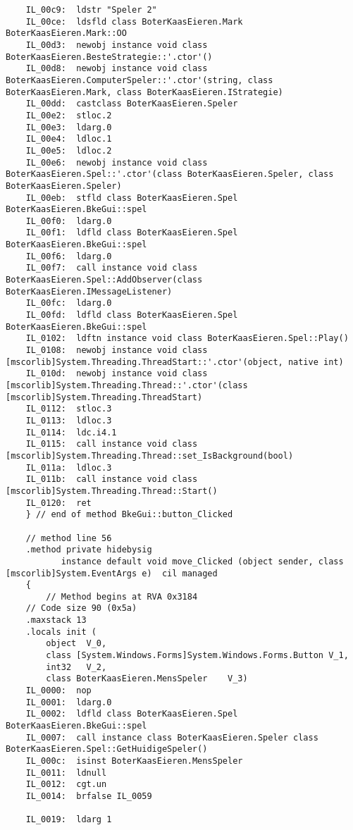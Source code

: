 \begin{lstlisting}
	IL_00c9:  ldstr "Speler 2"
	IL_00ce:  ldsfld class BoterKaasEieren.Mark BoterKaasEieren.Mark::OO
	IL_00d3:  newobj instance void class BoterKaasEieren.BesteStrategie::'.ctor'()
	IL_00d8:  newobj instance void class BoterKaasEieren.ComputerSpeler::'.ctor'(string, class BoterKaasEieren.Mark, class BoterKaasEieren.IStrategie)
	IL_00dd:  castclass BoterKaasEieren.Speler
	IL_00e2:  stloc.2 
	IL_00e3:  ldarg.0 
	IL_00e4:  ldloc.1 
	IL_00e5:  ldloc.2 
	IL_00e6:  newobj instance void class BoterKaasEieren.Spel::'.ctor'(class BoterKaasEieren.Speler, class BoterKaasEieren.Speler)
	IL_00eb:  stfld class BoterKaasEieren.Spel BoterKaasEieren.BkeGui::spel
	IL_00f0:  ldarg.0 
	IL_00f1:  ldfld class BoterKaasEieren.Spel BoterKaasEieren.BkeGui::spel
	IL_00f6:  ldarg.0 
	IL_00f7:  call instance void class BoterKaasEieren.Spel::AddObserver(class BoterKaasEieren.IMessageListener)
	IL_00fc:  ldarg.0 
	IL_00fd:  ldfld class BoterKaasEieren.Spel BoterKaasEieren.BkeGui::spel
	IL_0102:  ldftn instance void class BoterKaasEieren.Spel::Play()
	IL_0108:  newobj instance void class [mscorlib]System.Threading.ThreadStart::'.ctor'(object, native int)
	IL_010d:  newobj instance void class [mscorlib]System.Threading.Thread::'.ctor'(class [mscorlib]System.Threading.ThreadStart)
	IL_0112:  stloc.3 
	IL_0113:  ldloc.3 
	IL_0114:  ldc.i4.1 
	IL_0115:  call instance void class [mscorlib]System.Threading.Thread::set_IsBackground(bool)
	IL_011a:  ldloc.3 
	IL_011b:  call instance void class [mscorlib]System.Threading.Thread::Start()
	IL_0120:  ret 
    } // end of method BkeGui::button_Clicked

    // method line 56
    .method private hidebysig 
           instance default void move_Clicked (object sender, class [mscorlib]System.EventArgs e)  cil managed 
    {
        // Method begins at RVA 0x3184
	// Code size 90 (0x5a)
	.maxstack 13
	.locals init (
		object	V_0,
		class [System.Windows.Forms]System.Windows.Forms.Button	V_1,
		int32	V_2,
		class BoterKaasEieren.MensSpeler	V_3)
	IL_0000:  nop 
	IL_0001:  ldarg.0 
	IL_0002:  ldfld class BoterKaasEieren.Spel BoterKaasEieren.BkeGui::spel
	IL_0007:  call instance class BoterKaasEieren.Speler class BoterKaasEieren.Spel::GetHuidigeSpeler()
	IL_000c:  isinst BoterKaasEieren.MensSpeler
	IL_0011:  ldnull 
	IL_0012:  cgt.un 
	IL_0014:  brfalse IL_0059

	IL_0019:  ldarg 1


\end{lstlisting}
